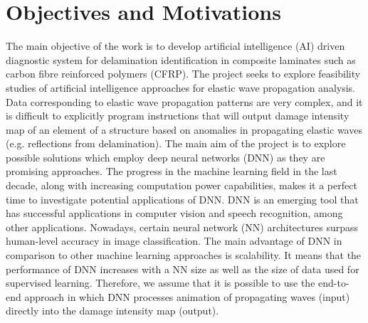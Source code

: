 \section{Objectives and Motivations}
\label{sec13}

The main objective of the work is to develop artificial intelligence (AI) driven diagnostic system for delamination identification in composite laminates such as carbon fibre reinforced polymers (CFRP). 
The project seeks to explore feasibility studies of artificial intelligence approaches for elastic wave propagation analysis. 
Data corresponding to elastic wave propagation patterns are very complex, and it is difficult to explicitly program instructions that will output damage intensity map of an element of a structure based on anomalies in propagating elastic waves (e.g. reflections from delamination). 
The main aim of the project is to explore possible solutions which employ deep neural networks (DNN) as they are promising approaches. 
The progress in the machine learning field in the last decade, along with increasing computation power capabilities, makes it a perfect time to investigate potential applications of DNN. 
DNN is an emerging tool that has successful applications in computer vision and speech recognition, among other applications. 
Nowadays, certain neural network (NN) architectures surpass human-level accuracy in image classification. 
The main advantage of DNN in comparison to other machine learning approaches is scalability. 
It means that the performance of DNN increases with a NN size as well as the size of data used for supervised learning. 
Therefore, we assume that it is possible to use the end-to-end approach in which DNN processes animation of propagating waves (input) directly into the damage intensity map (output).

